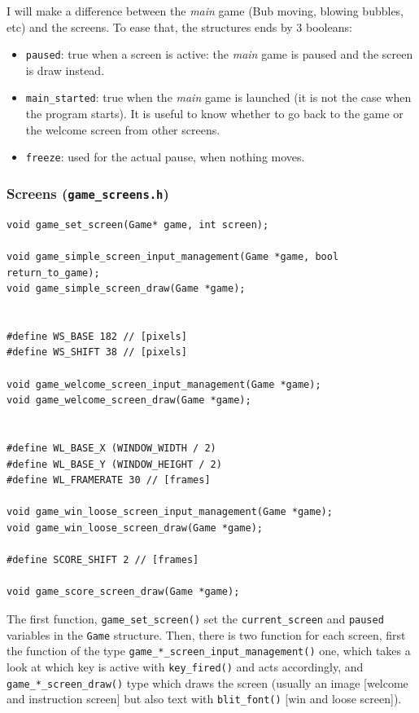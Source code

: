 \documentclass[12pt,a4paper]{article}
\newcommand{\cc}[1]{\texttt{#1}}
\begin{document}
I will make a difference between the \textit{main} game (Bub moving, blowing bubbles, etc) and the screens. To ease that, the structures ends by 3 booleans:\begin{itemize}
\item \cc{paused}: true when a screen is active: the \textit{main} game is paused and the screen is draw instead.
\item \cc{main_started}: true when the \textit{main} game is launched (it is not the case when the program starts). It is useful to know whether to go back to the game or the welcome screen from other screens.
\item \cc{freeze}: used for the actual pause, when nothing moves.
\end{itemize}

\subsubsection{Screens (\texttt{game\_screens.h})}

\begin{verbatim}
void game_set_screen(Game* game, int screen);

void game_simple_screen_input_management(Game *game, bool return_to_game);
void game_simple_screen_draw(Game *game);


#define WS_BASE 182 // [pixels]
#define WS_SHIFT 38 // [pixels]

void game_welcome_screen_input_management(Game *game);
void game_welcome_screen_draw(Game *game);


#define WL_BASE_X (WINDOW_WIDTH / 2)
#define WL_BASE_Y (WINDOW_HEIGHT / 2)
#define WL_FRAMERATE 30 // [frames]

void game_win_loose_screen_input_management(Game *game);
void game_win_loose_screen_draw(Game *game);

#define SCORE_SHIFT 2 // [frames]

void game_score_screen_draw(Game *game);
\end{verbatim}

The first function, \cc{game_set_screen()} set the \cc{current_screen} and \cc{paused} variables in the \cc{Game} structure. Then, there is two function for each screen, first the function of the type \cc{game_*_screen_input_management()} one, which takes a look at which key is active with \cc{key_fired()} and acts accordingly, and \cc{game_*_screen_draw()} type which draws the screen (usually an image [welcome and instruction screen] but also text with \cc{blit_font()} [win and loose screen]).
\end{document}
